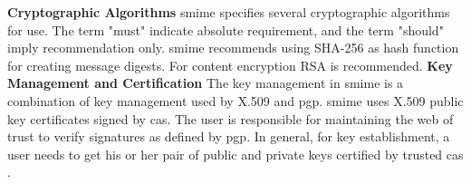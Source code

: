 \textbf{Cryptographic Algorithms}
\newline
\acrshort{smime} specifies several cryptographic algorithms for use. The term "must" indicate absolute requirement, and the term "should" imply recommendation only. \acrshort{smime} recommends using SHA-256 as hash function for creating message digests. For content encryption RSA is recommended.
\newline
\newline
\textbf{Key Management and Certification}
\newline
The key management in \acrshort{smime} is a combination of key management used by X.509 and \acrshort{pgp}. \acrshort{smime} uses X.509 public key certificates signed by \acrshort{ca}s. The user is responsible for maintaining the web of trust to verify signatures as defined by \acrshort{pgp}. In general, for key establishment, a user needs to get his or her pair of public and private keys certified by trusted \acrshort{ca}s \cite{SEmailETU}.